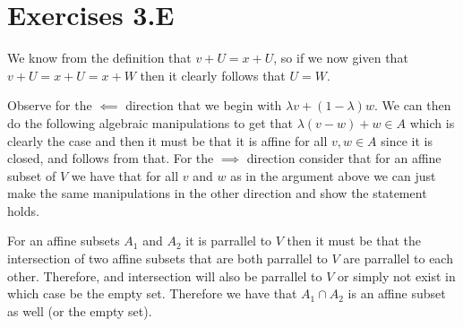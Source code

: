 \section{Exercises 3.E}
\begin{q}[7]
    We know from the definition that $ v + U = x + U $, so if we now given that $ v + U = x + U = x + W $ then it clearly follows that $ U = W $. 
\end{q}
\begin{q}[8]
    Observe for the $ \impliedby $ direction that we begin with $ \lambda v + (1 - \lambda)w $. 
    We can then do the following algebraic manipulations to get that $ \lambda(v-w) + w \in A $ which is clearly the case and then it must be that it is affine for all $ v, w \in A $ since it is closed, and follows from that. 
    For the $ \implies $ direction consider that for an affine subset of $ V $ we have that for all $ v $ and $ w $ as in the argument above we can just make the same manipulations in the other direction and show the statement holds.
\end{q}
\begin{q}[9]
    For an affine subsets $ A_1 $ and $ A_2$  it is parrallel to $ V $ then it must be that the intersection of two affine subsets that are both parrallel to $ V $ are parrallel to each other. 
    Therefore, and intersection will also be parrallel to $ V $ or simply not exist in which case be the empty set. Therefore we have that $A_1 \cap A_2 $ is an affine subset as well (or the empty set). 
\end{q}

